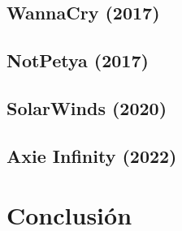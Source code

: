 \documentclass{article}
\begin{document}
\subsection{WannaCry (2017)}

\subsection{NotPetya (2017)}


\subsection{SolarWinds (2020)}

\subsection{Axie Infinity (2022)}

\section{Conclusión}

\newpage
\printbibliography
\end{document}
